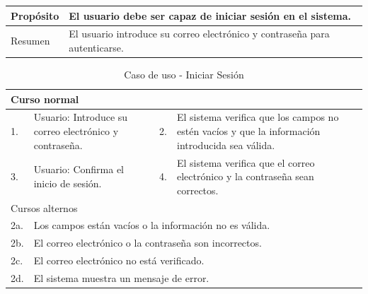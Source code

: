 \begin{table}[H]
    \centering
    \begin{tabular}{| m{} | m{} | m{} | m{} |}
        \hline
        Propósito & \multicolumn{3}{m{0.67\textwidth}|}{El usuario debe ser capaz de iniciar sesión en el sistema.}   \\ 
        \hline
        Resumen & \multicolumn{3}{m{0.67\textwidth}|}{El usuario introduce su correo electrónico y contraseña para autenticarse.} \\ 
        \hline
    \end{tabular}
\end{table}



\begin{table}[H]
    \centering
    \begin{tabular}{| m{} | m{} | m{} | m{} |}
        \hline
        \multicolumn{4}{|m{0.9\textwidth}|}{Curso normal}     \\ 
        \hline
        1. & Usuario: Introduce su correo electrónico y contraseña. 
        & 2. & El sistema verifica que los campos no estén vacíos y que la información introducida sea válida. \\ 
        \hline
        3. & Usuario: Confirma el inicio de sesión. & 4. & El sistema verifica que el correo electrónico y la contraseña sean correctos.   \\ 
        \hline
        \multicolumn{4}{|m{0.9\textwidth}|}{Cursos alternos}     \\
        \hline 
        2a. & \multicolumn{3}{l|}{Los campos están vacíos o la información no es válida.} \\ 
        \hline
        2b. & \multicolumn{3}{l|}{El correo electrónico o la contraseña son incorrectos.} \\ 
        \hline
        2c. & \multicolumn{3}{l|}{El correo electrónico no está verificado.} \\
        \hline
        2d. & \multicolumn{3}{l|}{El sistema muestra un mensaje de error.} \\ 
        \hline
    \end{tabular}
    \caption{Caso de uso - Iniciar Sesión}
\end{table}

\newpage

